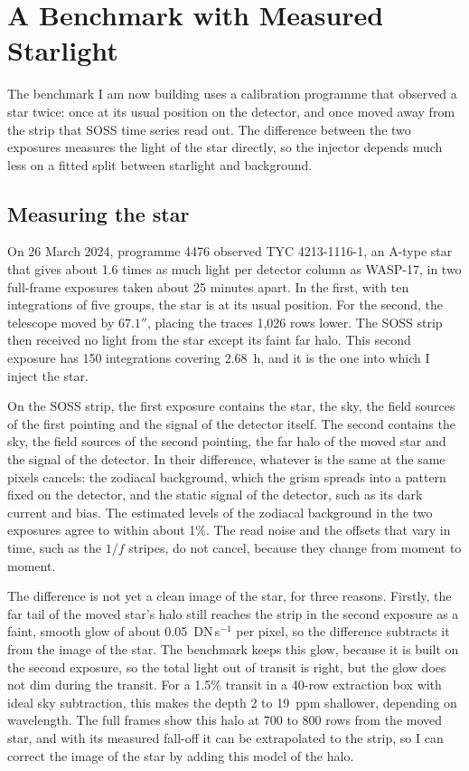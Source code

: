 \section{A Benchmark with Measured Starlight}
\label{sec:measured-benchmark}

The benchmark I am now building uses a calibration programme that observed a
star twice: once at its usual position on the detector, and once moved away
from the strip that SOSS time series read out. The difference between the two
exposures measures the light of the star directly, so the injector depends
much less on a fitted split between starlight and background.

\subsection{Measuring the star}
\label{sec:measuring-star}

On 26 March 2024, programme 4476 \citep{VolkEspinoza2023} observed
TYC 4213-1116-1, an
A-type star that gives about 1.6 times as much light per detector column as
WASP-17, in two full-frame exposures taken about 25 minutes apart. In the
first, with ten integrations of five groups, the star is at its usual
position. For the second, the telescope moved by $67.1''$, placing the traces
1,026 rows lower. The SOSS strip then received no light from the star except
its faint far halo. This second exposure has 150 integrations covering
2.68~h, and it is the one into which I inject the star.

On the SOSS strip, the first exposure contains the star, the sky, the field
sources of the first pointing and the signal of the detector itself. The
second contains the sky, the field sources of the second pointing, the far
halo of the moved star and the signal of the detector. In their difference,
whatever is the same at the same pixels cancels: the zodiacal background,
which the grism spreads into a pattern fixed on the detector, and the static
signal of the detector, such as its dark current and bias. The estimated
levels of the zodiacal background in the two exposures agree to within about
1\%. The read noise and the offsets that vary in time, such as the $1/f$
stripes, do not cancel, because they change from moment to moment.

The difference is not yet a clean image of the star, for three reasons.
Firstly, the far tail of the moved star's halo still reaches the strip in the
second exposure as a faint, smooth glow of about
0.05~DN\,s$^{-1}$ per pixel, so the difference subtracts it from the image of
the star. The benchmark keeps this glow, because it is built on the second
exposure, so the total light out of transit is right, but the glow does not
dim during the transit. For a 1.5\% transit in a 40-row extraction box with
ideal sky subtraction, this makes the depth 2 to 19~ppm shallower, depending
on wavelength. The full frames show this halo at 700 to 800 rows from the
moved star, and with its measured fall-off it can be extrapolated to the
strip, so I can correct the image of the star by adding this model of the
halo.

